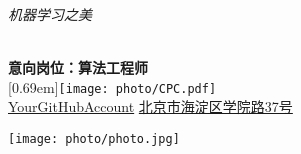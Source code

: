 \documentclass{resume}
\begin{document}



\begin{minipage}{0.8\textwidth}                                                                
\begin{flushleft}
  \begin{Huge}{\color{black}\textit{机器学习之美}}\end{Huge} \vspace{0.15cm}\\
   \textbf{\large 意向岗位：算法工程师}\vspace{0.3cm}\\
 [0.69em]{\hspace{-0.06cm}\texttt{[image: photo/CPC.pdf]}}\hspace{0.1cm}{中共党员}\vspace{0.08cm} \hspace{0.65cm}  {\color{black}\faPhone} {\color{wechat_green}\faWechat}\hspace{0.1cm}{$(+86) 166$-$8888$-$6666$} \hspace{0.65cm}{\color{black}\faEnvelopeO}\hspace{0.1cm}{youremail@gmail.com}  \vspace{0.08cm} \\
{\color{black}\faGithub}\hspace{0.1cm}\href{https://github.com}{YourGitHubAccount}  \hspace{0.55cm}  {\color{black}\faMapMarker}\hspace{0.1cm}\href{https://j.map.baidu.com/7d/NTc}{北京市海淀区学院路37号}
  \end{flushleft}
  \end{minipage}
  \hfill
  \begin{minipage}{0.2\textwidth} 
  \begin{center}
  \texttt{[image: photo/photo.jpg]} %
   \end{center}
   \end{minipage}
\vspace{-0.5cm}

\end{document}
